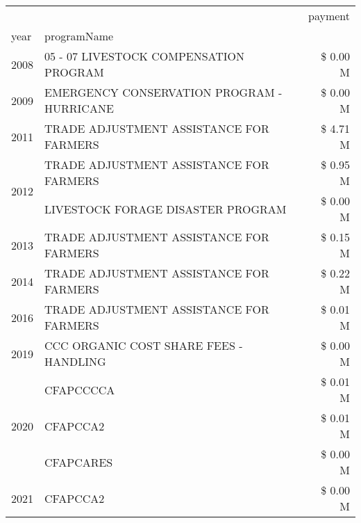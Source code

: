 \begin{tabular}{llr}
\toprule
 &  & payment \\
year & programName &  \\
\midrule
2008 & 05 - 07 LIVESTOCK COMPENSATION PROGRAM & \$ 0.00 M \\
\cline{1-3}
2009 & EMERGENCY CONSERVATION PROGRAM - HURRICANE & \$ 0.00 M \\
\cline{1-3}
2011 & TRADE ADJUSTMENT ASSISTANCE FOR FARMERS & \$ 4.71 M \\
\cline{1-3}
\multirow[t]{2}{*}{2012} & TRADE ADJUSTMENT ASSISTANCE FOR FARMERS & \$ 0.95 M \\
 & LIVESTOCK FORAGE DISASTER PROGRAM & \$ 0.00 M \\
\cline{1-3}
2013 & TRADE ADJUSTMENT ASSISTANCE FOR FARMERS & \$ 0.15 M \\
\cline{1-3}
2014 & TRADE ADJUSTMENT ASSISTANCE FOR FARMERS & \$ 0.22 M \\
\cline{1-3}
2016 & TRADE ADJUSTMENT ASSISTANCE FOR FARMERS & \$ 0.01 M \\
\cline{1-3}
2019 & CCC ORGANIC COST SHARE FEES - HANDLING & \$ 0.00 M \\
\cline{1-3}
\multirow[t]{3}{*}{2020} & CFAPCCCCA & \$ 0.01 M \\
 & CFAPCCA2 & \$ 0.01 M \\
 & CFAPCARES & \$ 0.00 M \\
\cline{1-3}
2021 & CFAPCCA2 & \$ 0.00 M \\
\cline{1-3}
\bottomrule
\end{tabular}
